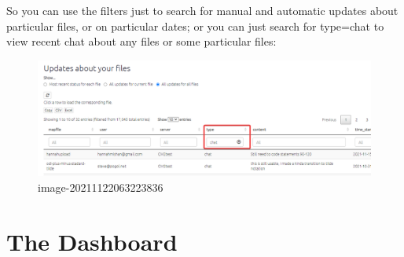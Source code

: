 \documentclass[
]{book}
\begin{document}
So you can use the filters just to search for manual and automatic updates about particular files, or on particular dates; or you can just search for type=chat to view recent chat about any files or some particular files:

\begin{figure}
\centering
\includegraphics{_assets/image-20211122063223836.png}
\caption{image-20211122063223836}
\end{figure}

\hypertarget{xdashboard-advanced}{%
\chapter{The Dashboard}\label{xdashboard-advanced}}
\end{document}
